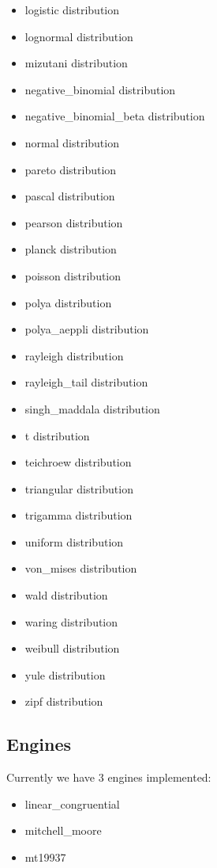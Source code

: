 \begin{itemize}
    \item logistic distribution
    \item lognormal distribution
    \item mizutani distribution
    \item negative\_binomial distribution
    \item negative\_binomial\_beta distribution
    \item normal distribution
    \item pareto distribution
    \item pascal distribution
    \item pearson distribution
    \item planck distribution
    \item poisson distribution
    \item polya distribution
    \item polya\_aeppli distribution
    \item rayleigh distribution
    \item rayleigh\_tail distribution
    \item singh\_maddala distribution
    \item t distribution
    \item teichroew distribution
    \item triangular distribution
    \item trigamma distribution
    \item uniform distribution
    \item von\_mises distribution
    \item wald distribution
    \item waring distribution
    \item weibull distribution
    \item yule distribution
    \item zipf distribution
\end{itemize}

\subsection{Engines}
Currently we have 3 engines implemented:
\begin{itemize}
    \item linear\_congruential
    \item mitchell\_moore
    \item mt19937
\end{itemize}



